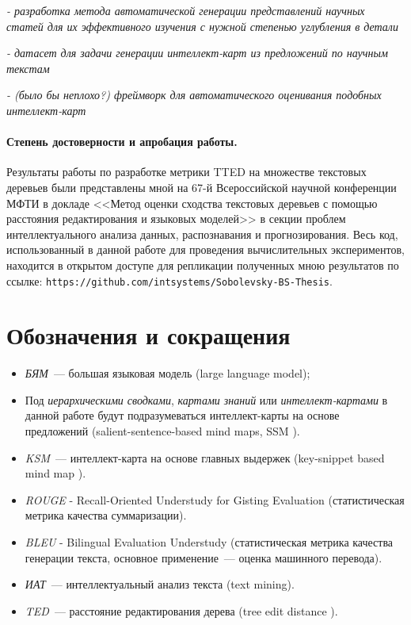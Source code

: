\documentclass[12pt]{article}
\begin{document}
\textit{- разработка метода автоматической генерации представлений научных статей для их эффективного изучения с нужной степенью углубления в детали}

\textit{- датасет для задачи генерации интеллект-карт из предложений по научным текстам}

\textit{- (было бы неплохо?) фреймворк для автоматического оценивания подобных интеллект-карт}


\paragraph{Степень достоверности и апробация работы.} Результаты работы по разработке метрики TTED на множестве текстовых деревьев были представлены мной на 67-й Всероссийской научной конференции МФТИ в докладе <<Метод оценки сходства текстовых деревьев с помощью расстояния редактирования и языковых моделей>> в секции проблем интеллектуального анализа данных, распознавания и прогнозирования. Весь код, использованный в данной работе для проведения вычислительных экспериментов, находится в открытом доступе для репликации полученных мною результатов по ссылке: \texttt{https://github.com/intsystems/Sobolevsky-BS-Thesis}.

\newpage
\section*{Обозначения и сокращения}
\begin{itemize}
    \item \textit{БЯМ}~--- большая языковая модель (large language model);
    
    \item Под \textit{иерархическими сводками}, \textit{картами знаний} или \textit{интеллект-картами} в данной работе будут подразумеваться интеллект-карты на основе предложений (salient-sentence-based mind maps, SSM \cite{wei2019revealing}).

    \item \textit{KSM}~--- интеллект-карта на основе главных выдержек (key-snippet based mind map \cite{wei2019revealing}).

    \item \textit{ROUGE} - Recall-Oriented Understudy for Gisting Evaluation (статистическая метрика качества суммаризации).

    \item \textit{BLEU} - Bilingual Evaluation Understudy (статистическая метрика качества генерации текста, основное применение~--- оценка машинного перевода).

    \item \textit{ИАТ}~--- интеллектуальный анализ текста (text mining).

    \item \textit{TED}~--- расстояние редактирования дерева (tree edit distance \cite{zhang1989simple}).
\end{itemize}
\end{document}
